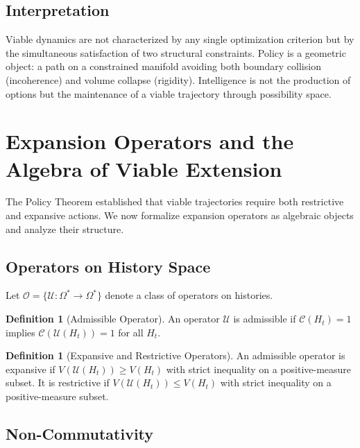 \documentclass[12pt, a4paper]{article}
\theoremstyle{plain}
\theoremstyle{definition}
\newtheorem{definition}[theorem]{Definition}
\theoremstyle{remark}
\begin{document}
\subsection{Interpretation}

Viable dynamics are not characterized by any single optimization criterion but by the simultaneous satisfaction of two structural constraints. Policy is a geometric object: a path on a constrained manifold avoiding both boundary collision (incoherence) and volume collapse (rigidity). Intelligence is not the production of options but the maintenance of a viable trajectory through possibility space.

\section{Expansion Operators and the Algebra of Viable Extension}

The Policy Theorem established that viable trajectories require both restrictive and expansive actions. We now formalize expansion operators as algebraic objects and analyze their structure.

\subsection{Operators on History Space}

Let $\mathcal{O} = \{ \mathcal{U} : \Omega^* \to \Omega^* \}$ denote a class of operators on histories.

\begin{definition}[Admissible Operator]
An operator $\mathcal{U}$ is admissible if $\mathcal{C}(H_t) = 1$ implies $\mathcal{C}(\mathcal{U}(H_t)) = 1$ for all $H_t$.
\end{definition}

\begin{definition}[Expansive and Restrictive Operators]
An admissible operator is expansive if $V(\mathcal{U}(H_t)) \geq V(H_t)$ with strict inequality on a positive-measure subset. It is restrictive if $V(\mathcal{U}(H_t)) \leq V(H_t)$ with strict inequality on a positive-measure subset.
\end{definition}

\subsection{Non-Commutativity}
\end{document}
